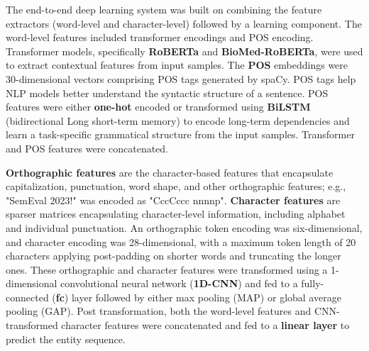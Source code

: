 \documentclass[11pt]{article}
\begin{document}
The end-to-end deep learning system was built on combining the feature extractors (word-level and character-level) followed by a learning component.
The word-level features included transformer encodings and POS encoding.
Transformer models, specifically \textbf{RoBERTa} and \textbf{BioMed-RoBERTa}, were used to extract contextual features from input samples.
The \textbf{POS} embeddings were 30-dimensional vectors comprising POS tags generated by spaCy. 
POS tags help NLP models better understand the syntactic structure of a sentence.
POS features were either \textbf{one-hot} encoded or transformed using \textbf{BiLSTM} (bidirectional Long short-term memory) to encode long-term dependencies and learn a task-specific grammatical structure from the input samples.
Transformer and POS features were concatenated. 



\textbf{Orthographic features} are the character-based features that encapsulate capitalization, punctuation, word shape, and other orthographic features; e.g., "SemEval 2023!" was encoded as "CccCccc nnnnp". 
\textbf{Character features} are sparser matrices encapsulating character-level information, including alphabet and individual punctuation.
An orthographic token encoding was six-dimensional, and character encoding was 28-dimensional, with a maximum token length of 20 characters applying post-padding on shorter words and truncating the longer ones.
These orthographic and character features were transformed using a 1-dimensional convolutional neural network (\textbf{1D-CNN}) and fed to a fully-connected (\textbf{fc}) layer followed by either max pooling (MAP) or global average pooling (GAP).
Post transformation, both  the word-level features and CNN-transformed character features were concatenated and fed to a \textbf{linear layer} to predict the entity sequence.
\end{document}
